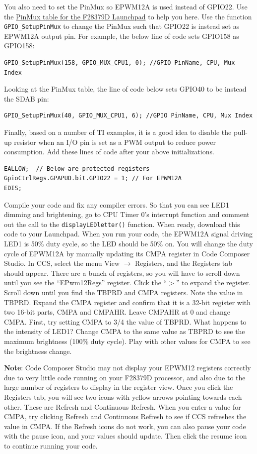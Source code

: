 \documentclass[11pt]{article}
\begin{document}
You also need to set the PinMux so EPWM12A is used instead of GPIO22. Use the \href{http://coecsl.ece.illinois.edu/se423/hw/PinMuxTableF28379DLaunchPad.pdf}{PinMux table for the F28379D Launchpad} to help you here. Use the function \texttt{GPIO_SetupPinMux} to change the PinMux such that GPIO22 is instead set as EPWM12A output pin. For example, the below line of code sets GPIO158 as GPIO158:
%
\begin{verbatim}
GPIO_SetupPinMux(158, GPIO_MUX_CPU1, 0); //GPIO PinName, CPU, Mux Index
\end{verbatim}
%
Looking at the PinMux table, the line of code below sets GPIO40 to be instead the SDAB pin:
%
\begin{verbatim}
GPIO_SetupPinMux(40, GPIO_MUX_CPU1, 6); //GPIO PinName, CPU, Mux Index
\end{verbatim}
%
Finally, based on a number of TI examples, it is a good idea to disable the pull-up resistor when an I/O pin is set as a PWM output to reduce power consumption. Add these lines of code after your above initializations.
%
\begin{verbatim}
EALLOW;  // Below are protected registers
GpioCtrlRegs.GPAPUD.bit.GPIO22 = 1; // For EPWM12A
EDIS;
\end{verbatim}
%
Compile your code and fix any compiler errors. So that you can see LED1 dimming and brightening, go to CPU Timer 0’s interrupt function and comment out the call to the \texttt{displayLEDletter()} function. When ready, download this code to your Launchpad. When you run your code, the EPWM12A signal driving LED1 is 50\% duty cycle, so the LED should be 50\% on. You will change the duty cycle of EPWM12A by manually updating its CMPA register in Code Composer Studio. In CCS, select the menu View $\rightarrow$ Registers, and the Registers tab should appear. There are a bunch of registers, so you will have to scroll down until you see the “EPwm12Regs” register. Click the “$>$” to expand the register. Scroll down until you find the TBPRD and CMPA registers. Note the value in TBPRD. Expand the CMPA register and confirm that it is a 32-bit register with two 16-bit parts, CMPA and CMPAHR. Leave CMPAHR at 0 and change CMPA. First, try setting CMPA to 3/4 the value of TBPRD. What happens to the intensity of LED1? Change CMPA to the same value as TBPRD to see the maximum brightness (100\% duty cycle). Play with other values for CMPA to see the brightness change.

\textbf{Note}: Code Composer Studio may not display your EPWM12 registers correctly due to very little code running on your F28379D processor, and also due to the large number of registers to display in the register view. Once you click the Registers tab, you will see two icons with yellow arrows pointing towards each other. These are Refresh and Continuous Refresh. When you enter a value for CMPA, try clicking Refresh and Continuous Refresh to see if CCS refreshes the value in CMPA. If the Refresh icons do not work, you can also pause your code with the pause icon, and your values should update. Then click the resume icon to continue running your code.
\end{document}
